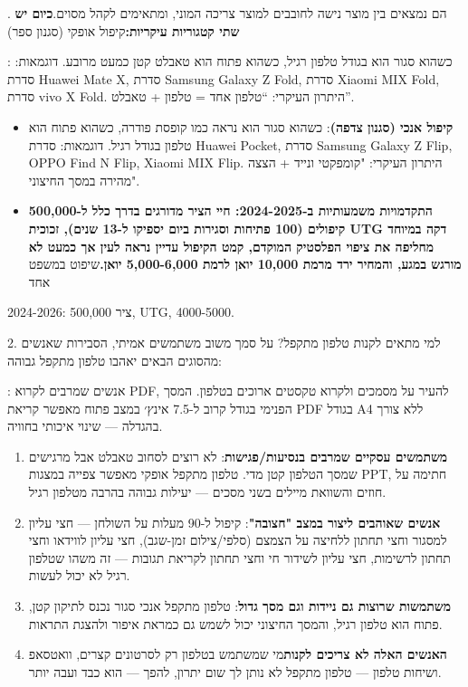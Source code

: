 


. הם נמצאים בין מוצר נישה לחובבים למוצר צריכה המוני, ומתאימים לקהל מסוים.\textbf{כיום יש שתי קטגוריות עיקריות:}קיפול אופקי (סגנון ספר)

: כשהוא סגור הוא בגודל טלפון רגיל, כשהוא פתוח הוא טאבלט קטן כמעט מרובע. דוגמאות: סדרת Huawei Mate X, סדרת Samsung Galaxy Z Fold, סדרת Xiaomi MIX Fold, סדרת vivo X Fold. היתרון העיקרי: “טלפון אחד = טלפון + טאבלט”.

\begin{itemize}
  \item \textbf{קיפול אנכי (סגנון צדפה)}: כשהוא סגור הוא נראה כמו קופסת פודרה, כשהוא פתוח הוא טלפון בגודל רגיל. דוגמאות: סדרת Huawei Pocket, סדרת Samsung Galaxy Z Flip, OPPO Find N Flip, Xiaomi MIX Flip. היתרון העיקרי: "קומפקטי ונייד + הצצה מהירה במסך החיצוני".
  \item \textbf{התקדמויות משמעותיות ב-2024-2025: חיי הציר מדורגים בדרך כלל ל-500,000 קיפולים (100 פתיחות וסגירות ביום יספיקו ל-13 שנים), זכוכית UTG דקה במיוחד מחליפה את ציפוי הפלסטיק המוקדם, קמט הקיפול עדיין נראה לעין אך כמעט לא מורגש במגע, והמחיר ירד מרמת 10,000 יואן לרמת 5,000-6,000 יואן.}שיפוט במשפט אחד
\end{itemize}

2024-2026: ציר 500,000, UTG, 4000-5000.

\begin{tcbinfo}{2. למי מתאים לקנות טלפון מתקפל?}
על סמך משוב משתמשים אמיתי, הסבירות שאנשים מהסוגים הבאים יאהבו טלפון מתקפל גבוהה:

\end{tcbinfo}


: אנשים שמרבים לקרוא PDF, להעיר על מסמכים ולקרוא טקסטים ארוכים בטלפון. המסך הפנימי בגודל קרוב ל-7.5 אינץ׳ במצב פתוח מאפשר קריאת PDF בגודל A4 ללא צורך בהגדלה — שינוי איכותי בחוויה.

\begin{enumerate}
  \item \textbf{משתמשים עסקיים שמרבים בנסיעות/פגישות}: לא רוצים לסחוב טאבלט אבל מרגישים שמסך הטלפון קטן מדי. טלפון מתקפל אופקי מאפשר צפייה במצגות PPT, חתימה על חוזים והשוואת מיילים בשני מסכים — יעילות גבוהה בהרבה מטלפון רגיל.
  \item \textbf{אנשים שאוהבים ליצור במצב "חצובה"}: קיפול ל-90 מעלות על השולחן — חצי עליון למסגור וחצי תחתון ללחיצה על הצמצם (סלפי/צילום זמן-שגב), חצי עליון לווידאו וחצי תחתון לרשימות, חצי עליון לשידור חי וחצי תחתון לקריאת תגובות — זה משהו שטלפון רגיל לא יכול לעשות.
  \item \textbf{משתמשות שרוצות גם ניידות וגם מסך גדול}: טלפון מתקפל אנכי סגור נכנס לתיקון קטן, פתוח הוא טלפון רגיל, והמסך החיצוני יכול לשמש גם כמראת איפור ולהצגת התראות.
  \item \textbf{האנשים האלה לא צריכים לקנות}מי שמשתמש בטלפון רק לסרטונים קצרים, וואטסאפ ושיחות טלפון — טלפון מתקפל לא נותן לך שום יתרון, להפך — הוא כבד ועבה יותר.
\end{enumerate}

